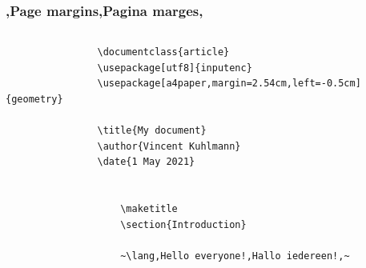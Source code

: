         
%         
            
%         

\begin{frame}[fragile]
    \frametitle{\lang,Page margins,Pagina marges,}
    \begin{columns}
        \begin{column}{0.67\textwidth}
            \begin{verbatim}
                \documentclass{article}
                \usepackage[utf8]{inputenc}
                \usepackage[a4paper,margin=2.54cm,left=-0.5cm]{geometry}
                
                \title{My document}
                \author{Vincent Kuhlmann}
                \date{1 May 2021}
                
                
                    \maketitle
                    \section{Introduction}
                    
                    ~\lang,Hello everyone!,Hallo iedereen!,~
                

\end{verbatim}
\end{column}
\end{columns}
\end{frame}
